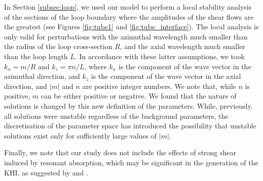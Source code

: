 In Section \ref{subsec:loop}, we used our model to perform a local stability analysis of the sections of the loop boundary where the amplitudes of the shear flows are the greatest (see Figures \ref{fig:tube1} and \ref{fig:tube_interface}).
The local analysis is only valid for perturbations with the azimuthal wavelength much smaller than the radius of the loop cross-section $R$, and the axial wavelength much smaller than the loop length $L$\/.
In accordance with these latter assumptions, we took $k_x = m/R$ and $k_z = \pi n/L$, where $k_x$ is the component of the wave vector in the azimuthal direction, and $k_z$ is the component of the wave vector in the axial direction, and $|m|$ and $n$ are positive integer numbers.
We note that, while $n$ is positive, $m$ can be either positive or negative.
We found that the nature of solutions is changed by this new definition of the parameters.
While, previously, all solutions were unstable regardless of the background parameters, the discretisation of the parameter space has introduced the possibility that unstable solutions exist only for sufficiently large values of $|m|$.

Finally, we note that our study does not include the effects of strong shear induced by resonant absorption, which may be significant in the generation of the KHI, as suggested by \cite{Howson2017b} and \cite{Terradas2018}.
